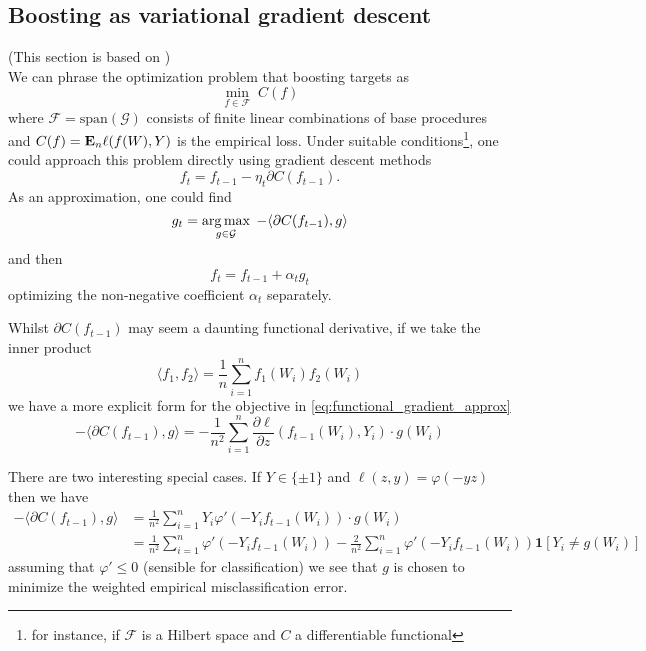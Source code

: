 \subsection{Boosting as variational gradient descent}
(This section is based on \cite{mason2000boosting}) \\
We can phrase the optimization problem that boosting targets as 
\begin{equation}
	\min_{f \in \mathcal{F}} \; C(f)
\end{equation}
where $\mathcal{F} = \text{span}(\mathcal{G})$ consists of finite linear combinations of base procedures and $C(f) = \mathbf{E}_n \ell(f(W), Y)$ is the empirical loss. Under suitable conditions\footnote{for instance, if $\mathcal{F}$ is a Hilbert space and $C$ a differentiable functional}, one could approach this problem directly using gradient descent methods
\begin{equation*}
	f_t = f_{t-1} - \eta_t \partial C (f_{t-1}).
\end{equation*}
As an approximation, one could find
\begin{equation}
	\label{eq:functional_gradient_approx}
	g_t = \operatorname*{arg\,max}_{g\in\mathcal{G}} \; -\langle \partial C(f_{t-1}), g \rangle
\end{equation}
and then 
\begin{equation*}
	f_t = f_{t-1} + \alpha_t g_t
\end{equation*}
optimizing the non-negative coefficient $\alpha_t$ separately.

Whilst $\partial C(f_{t-1})$ may seem a daunting functional derivative, if we take the inner product
\begin{equation}
	\label{eq:boost_inner_prod}
	\langle f_1, f_2 \rangle = \frac{1}{n} \sum_{i=1}^n f_1(W_i)f_2(W_i)
\end{equation}
we have a more explicit form for the objective in \eqref{eq:functional_gradient_approx}
\begin{equation*}
	-\langle \partial C(f_{t-1}), g \rangle = -\frac{1}{n^2} \sum_{i=1}^n \frac{\partial \ell}{\partial z}(f_{t-1}(W_i), Y_i) \cdot g(W_i)
\end{equation*}

There are two interesting special cases. If $Y \in \{\pm 1\}$ and $\ell(z, y) = \varphi(-yz)$ then we have
\begin{align*}
	-\langle \partial C(f_{t-1}), g \rangle &= \frac{1}{n^2}\sum_{i=1}^n Y_i\varphi '(-Y_i f_{t-1}(W_i)) \cdot g(W_i) \\	
	&= \frac{1}{n^2}\sum_{i=1}^n \varphi ' (-Y_i f_{t-1}(W_i)) - \frac{2}{n^2} \sum_{i=1}^n \varphi ' (-Y_i f_{t-1}(W_i)) \mathbf{1}[Y_i \ne g(W_i)]
\end{align*}
assuming that $\varphi ' \le 0$ (sensible for classification) we see that $g$ is chosen to minimize the weighted empirical misclassification error.

